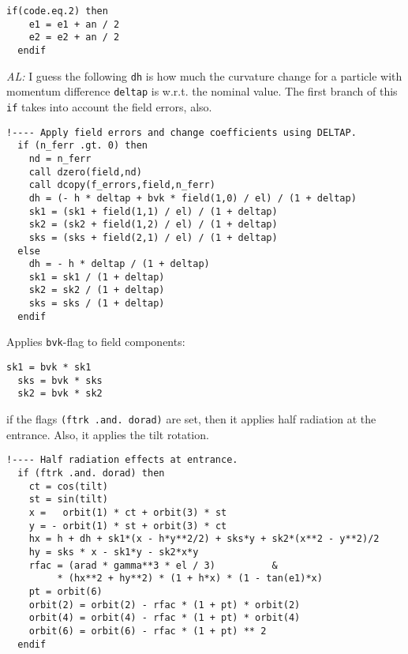 \documentclass{cern-art} %
\renewcommand{\L}[1]{\lstinline[firstnumber=last]{#1}}
\begin{document}
\begin{lstlisting}[firstnumber=last]
  if(code.eq.2) then
    e1 = e1 + an / 2
    e2 = e2 + an / 2
  endif
\end{lstlisting}
{\em AL:} I guess the following \L{dh} is how much the curvature change for a particle with momentum difference \L{deltap} is w.r.t. the nominal value. The first branch of this \L{if} takes into account the field errors, also.
\begin{lstlisting}[firstnumber=last]
  !---- Apply field errors and change coefficients using DELTAP.
  if (n_ferr .gt. 0) then
    nd = n_ferr
    call dzero(field,nd)
    call dcopy(f_errors,field,n_ferr)
    dh = (- h * deltap + bvk * field(1,0) / el) / (1 + deltap)
    sk1 = (sk1 + field(1,1) / el) / (1 + deltap)
    sk2 = (sk2 + field(1,2) / el) / (1 + deltap)
    sks = (sks + field(2,1) / el) / (1 + deltap)
  else
    dh = - h * deltap / (1 + deltap)
    sk1 = sk1 / (1 + deltap)
    sk2 = sk2 / (1 + deltap)
    sks = sks / (1 + deltap)
  endif
\end{lstlisting}
Applies \L{bvk}-flag to field components:
\begin{lstlisting}[firstnumber=last]
  sk1 = bvk * sk1
  sks = bvk * sks
  sk2 = bvk * sk2
\end{lstlisting}
  if the flags \L{(ftrk .and. dorad)} are set, then it applies half radiation at the entrance. Also, it applies the tilt rotation.
\begin{lstlisting}[firstnumber=last]
  !---- Half radiation effects at entrance.
  if (ftrk .and. dorad) then
    ct = cos(tilt)
    st = sin(tilt)
    x =   orbit(1) * ct + orbit(3) * st
    y = - orbit(1) * st + orbit(3) * ct
    hx = h + dh + sk1*(x - h*y**2/2) + sks*y + sk2*(x**2 - y**2)/2
    hy = sks * x - sk1*y - sk2*x*y
    rfac = (arad * gamma**3 * el / 3)          &
         * (hx**2 + hy**2) * (1 + h*x) * (1 - tan(e1)*x)
    pt = orbit(6)
    orbit(2) = orbit(2) - rfac * (1 + pt) * orbit(2)
    orbit(4) = orbit(4) - rfac * (1 + pt) * orbit(4)
    orbit(6) = orbit(6) - rfac * (1 + pt) ** 2
  endif
\end{lstlisting}


\end{document}
